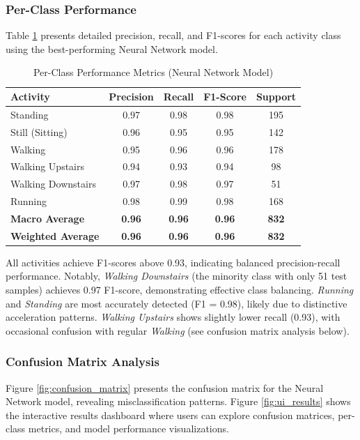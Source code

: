 \subsubsection{Per-Class Performance}
Table \ref{tab:perclass_metrics} presents detailed precision, recall, and F1-scores for each activity class using the best-performing Neural Network model.

\begin{table}[H]
    \centering
    \caption{Per-Class Performance Metrics (Neural Network Model)}
    \begin{tabular}{@{}lcccc@{}}
        \toprule
        Activity & Precision & Recall & F1-Score & Support \\ 
        \midrule
        Standing & 0.97 & 0.98 & 0.98 & 195 \\
        Still (Sitting) & 0.96 & 0.95 & 0.95 & 142 \\
        Walking & 0.95 & 0.96 & 0.96 & 178 \\
        Walking Upstairs & 0.94 & 0.93 & 0.94 & 98 \\
        Walking Downstairs & 0.97 & 0.98 & 0.97 & 51 \\
        Running & 0.98 & 0.99 & 0.98 & 168 \\
        \midrule
        \textbf{Macro Average} & \textbf{0.96} & \textbf{0.96} & \textbf{0.96} & \textbf{832} \\
        \textbf{Weighted Average} & \textbf{0.96} & \textbf{0.96} & \textbf{0.96} & \textbf{832} \\
        \bottomrule
    \end{tabular}
    \label{tab:perclass_metrics}
\end{table}

All activities achieve F1-scores above 0.93, indicating balanced precision-recall performance. Notably, \textit{Walking Downstairs} (the minority class with only 51 test samples) achieves 0.97 F1-score, demonstrating effective class balancing. \textit{Running} and \textit{Standing} are most accurately detected (F1 = 0.98), likely due to distinctive acceleration patterns. \textit{Walking Upstairs} shows slightly lower recall (0.93), with occasional confusion with regular \textit{Walking} (see confusion matrix analysis below).

\subsubsection{Confusion Matrix Analysis}
Figure \ref{fig:confusion_matrix} presents the confusion matrix for the Neural Network model, revealing misclassification patterns. Figure \ref{fig:ui_results} shows the interactive results dashboard where users can explore confusion matrices, per-class metrics, and model performance visualizations.

